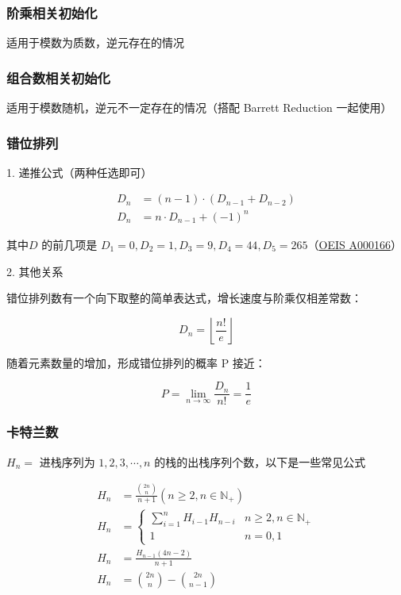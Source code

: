 \documentclass[12pt]{article}
\begin{document}
\subsubsection{阶乘相关初始化}

适用于模数为质数，逆元存在的情况



\newpage

\subsubsection{组合数相关初始化}

适用于模数随机，逆元不一定存在的情况（搭配 Barrett Reduction 一起使用）



\newpage

\subsubsection{错位排列}

1. 递推公式（两种任选即可）

$$
\begin{aligned}
	D_{n}&=(n-1)\cdot(D_{n-1}+D_{n-2})\\
	D_{n}&=n\cdot D_{n-1}+(-1)^{n}
\end{aligned}
$$

其中$D$ 的前几项是 $D_1=0, D_2=1, D_3=9, D_4=44, D_5=265 $（\href{http://oeis.org/A000166}{OEIS A000166}）

2. 其他关系

错位排列数有一个向下取整的简单表达式，增长速度与阶乘仅相差常数：

$$
D_n=\left\lfloor\frac{n!}{e}\right\rfloor
$$

随着元素数量的增加，形成错位排列的概率 P 接近：

$$
P=\lim_{n\to\infty}\frac{D_n}{n!}=\frac{1}{e}
$$

\subsubsection{卡特兰数}

$H_n=$ 进栈序列为 $1,2,3,\cdots,n$ 的栈的出栈序列个数，以下是一些常见公式

$$
\begin{aligned}
	H_{n}&=\frac{\binom{2n}{n}}{n+1}(n\ge2,n\in\mathbb{N}_{+})\\
	H_{n}&=
	\begin{cases}
		\sum_{i=1}^{n}H_{i-1}H_{n-i} & n\ge2,n\in\mathbb{N}_{+}\\
		1 & n=0,1
	\end{cases}\\
	H_{n}&=\frac{H_{n-1}(4n-2)}{n+1}\\
	H_{n}&=\binom{2n}{n}-\binom{2n}{n-1}
\end{aligned}
$$
\end{document}
